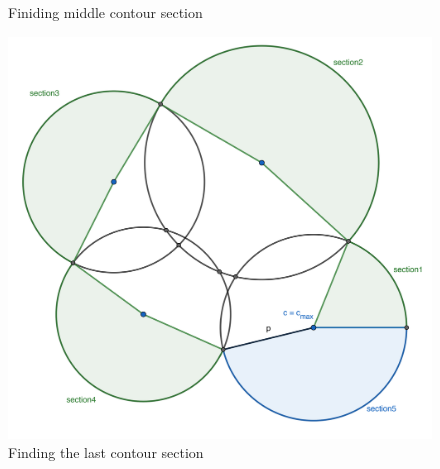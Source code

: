 \begin{figure}[!htb]
    \caption{Finiding middle contour section}\label{fig:contour2}
  \endminipage\hfill
    \includegraphics[width=1.0\textwidth]{figures/contour/c3copy.pdf}
    \caption{Finding the last contour section}\label{fig:contour3}
  \endminipage
\end{figure}

